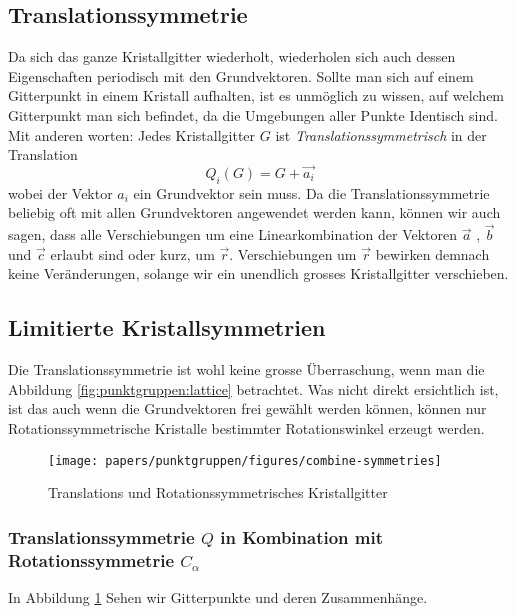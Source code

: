 \subsection{Translationssymmetrie}
Da sich das ganze Kristallgitter wiederholt, wiederholen sich auch dessen Eigenschaften periodisch mit den Grundvektoren.
Sollte man sich auf einem Gitterpunkt in einem Kristall aufhalten, ist es unmöglich zu wissen, auf welchem Gitterpunkt man sich befindet, 
da die Umgebungen aller Punkte Identisch sind. 
Mit anderen worten: Jedes Kristallgitter $ G $ ist \emph{Translationssymmetrisch} in der Translation 
\[
    Q_i(G) = G + \vec{a_i}
\] wobei der Vektor $a_i$ ein Grundvektor sein muss.
Da die Translationssymmetrie beliebig oft mit allen Grundvektoren angewendet werden kann, 
können wir auch sagen, dass alle Verschiebungen um eine Linearkombination 
der Vektoren $\vec{a}$ , $\vec{b}$ und $\vec{c}$ erlaubt sind oder kurz, um $\vec{r}$. 
Verschiebungen um $\vec{r}$ bewirken demnach keine Veränderungen, 
solange wir ein unendlich grosses Kristallgitter verschieben.

\subsection{Limitierte Kristallsymmetrien}
 Die Translationssymmetrie ist wohl keine grosse Überraschung, wenn man die Abbildung \ref{fig:punktgruppen:lattice} betrachtet.
 Was nicht direkt ersichtlich ist, ist das auch wenn die Grundvektoren frei gewählt werden können, 
 können nur Rotationssymmetrische Kristalle bestimmter Rotationswinkel erzeugt werden.

\begin{figure}
    \centering
    \texttt{[image: papers/punktgruppen/figures/combine-symmetries]}
    \caption{Translations und Rotationssymmetrisches Kristallgitter}
    \label{fig:punktgruppen:rot-geometry}
\end{figure}

 \subsubsection{Translationssymmetrie $Q$ in Kombination mit Rotationssymmetrie $C_\alpha$}     %
 In Abbildung \ref{fig:punktgruppen:rot-geometry} Sehen wir Gitterpunkte und deren Zusammenhänge.

